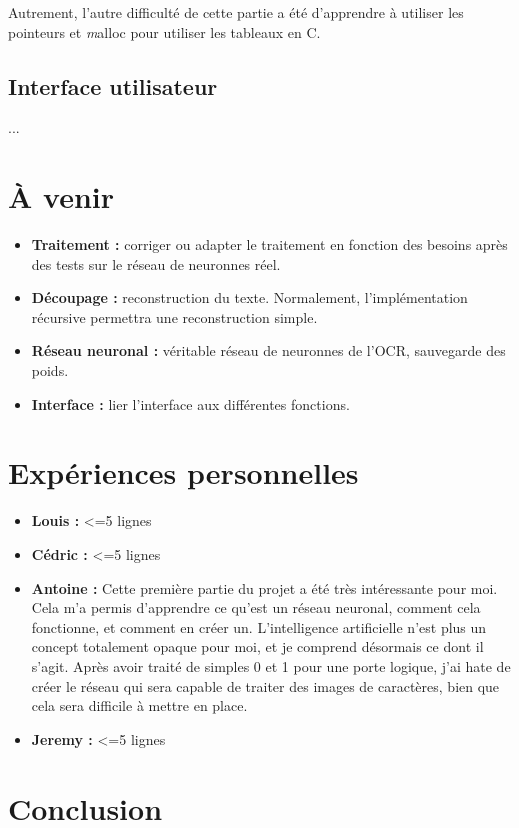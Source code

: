 \documentclass[12pt]{report}
\begin{document}
Autrement, l'autre difficulté de cette partie a été d'apprendre à utiliser les pointeurs et \textit malloc pour utiliser les tableaux en C.

\section*{Interface utilisateur}

...

\chapter{À venir}

\begin{itemize}
	\item \textbf{Traitement :} corriger ou adapter le traitement en fonction des besoins après des tests sur le réseau de neuronnes réel.
	\item \textbf{Découpage :} reconstruction du texte. Normalement, l'implémentation récursive permettra une reconstruction simple.
	\item \textbf{Réseau neuronal :} véritable réseau de neuronnes de l'OCR, sauvegarde des poids.
	\item \textbf{Interface :} lier l'interface aux différentes fonctions.
\end{itemize}

\chapter{Expériences personnelles}

\begin{itemize}
	\item \textbf{Louis :} <=5 lignes
	\item \textbf{Cédric :} <=5 lignes
	\item \textbf{Antoine :} Cette première partie du projet a été très intéressante pour moi. Cela m'a permis d'apprendre ce qu'est un réseau neuronal, comment cela fonctionne, et comment en créer un. L'intelligence artificielle n'est plus un concept totalement opaque pour moi, et je comprend désormais ce dont il s'agit. Après avoir traité de simples 0 et 1 pour une porte logique, j'ai hate de créer le réseau qui sera capable de traiter des images de caractères, bien que cela sera difficile à mettre en place.
	\item \textbf{Jeremy :} <=5 lignes
\end{itemize}

\chapter{Conclusion}
\end{document}
